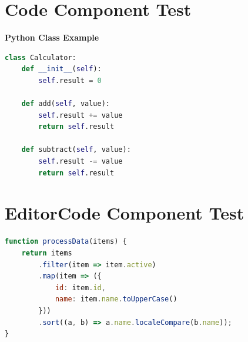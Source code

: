 \documentclass{article}
\begin{document}
\section{Code Component Test}
\textbf{Python Class Example}

\begin{lstlisting}[language=Python]
class Calculator:
    def __init__(self):
        self.result = 0

    def add(self, value):
        self.result += value
        return self.result

    def subtract(self, value):
        self.result -= value
        return self.result
\end{lstlisting}

\section{EditorCode Component Test}
\begin{lstlisting}[language=JavaScript]
function processData(items) {
    return items
        .filter(item => item.active)
        .map(item => ({
            id: item.id,
            name: item.name.toUpperCase()
        }))
        .sort((a, b) => a.name.localeCompare(b.name));
}
\end{lstlisting}
\end{document}
